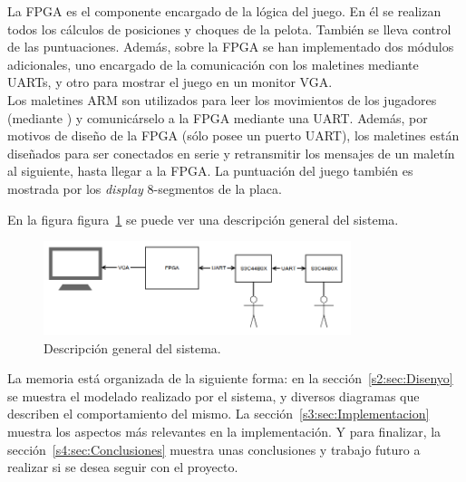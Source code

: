 La FPGA es el componente encargado de la lógica del juego. En él se
realizan todos los cálculos de posiciones y choques de la pelota. También
se lleva control de las puntuaciones. Además, sobre la FPGA se han
implementado dos módulos adicionales, uno encargado de la comunicación con
los maletines mediante UARTs, y otro para mostrar el juego en un monitor
VGA.\\
Los maletines ARM son utilizados para leer los movimientos de los jugadores
(mediante ) y comunicárselo a la FPGA
mediante una UART. Además, por motivos de diseño de la FPGA (sólo posee un
puerto UART), los maletines están diseñados para ser conectados en serie y
retransmitir los mensajes de un maletín al siguiente, hasta llegar a la
FPGA. La puntuación del juego también es mostrada por los \textit{display}
8-segmentos de la placa.

En la figura figura~\ref{s1:fig:vista_general_sistema} se puede ver una
descripción general del sistema.\\

\begin{figure}[h]
  \centering
  \includegraphics[width=0.8\textwidth]{images/descripcion_general.png}
  \caption{Descripción general del sistema.}
  \label{s1:fig:vista_general_sistema}
\end{figure}


La memoria está organizada de la siguiente forma:
en la sección~\ref{s2:sec:Disenyo} se muestra el modelado realizado por el
sistema, y diversos diagramas que describen el comportamiento del mismo. La
sección~\ref{s3:sec:Implementacion} muestra los aspectos más relevantes en
la implementación. Y para finalizar, la sección~\ref{s4:sec:Conclusiones}
muestra unas conclusiones y trabajo futuro a realizar si se desea seguir
con el proyecto.








%
%


